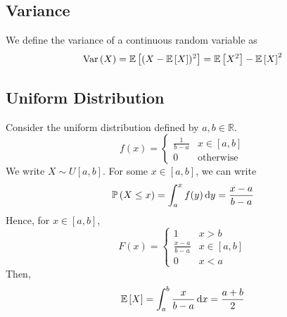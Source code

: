 \subsection{Variance}
We define the variance of a continuous random variable as
\[
	\operatorname{Var}\left({X}\right) = \mathbb{E}\left[{(X - \mathbb{E}\left[{X}\right])^2}\right] = \mathbb{E}\left[{X^2}\right] - \mathbb{E}\left[{X}\right]^2
\]

\subsection{Uniform Distribution}
Consider the uniform distribution defined by \(a, b \in\mathbb R\).
\[
	f(x) = \begin{cases}
		\frac{1}{b-a} & x \in [a, b]     \\
		0             & \text{otherwise}
	\end{cases}
\]
We write \(X \sim U[a, b]\).
For some \(x \in [a,b]\), we can write
\[
	\mathbb{P}\left({X \leq x}\right) = \int_a^x f(y) \dd{y} = \frac{x-a}{b-a}
\]
Hence, for \(x \in [a,b]\),
\[
	F(x) = \begin{cases}
		1               & x > b       \\
		\frac{x-a}{b-a} & x \in [a,b] \\
		0               & x < a
	\end{cases}
\]
Then,
\[
	\mathbb{E}\left[{X}\right] = \int_a^b \frac{x}{b-a} \dd{x} = \frac{a+b}{2}
\]

